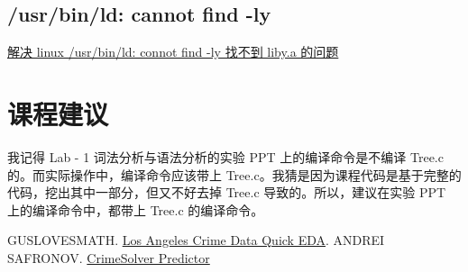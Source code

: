 \documentclass{article}
\begin{document}
\subsection{/usr/bin/ld: cannot find -ly}
\href{https://github.com/ArronVague/Compilers-Construction-Laboratory/issues/1}{解决 linux /usr/bin/ld: connot find -ly 找不到 liby.a 的问题}

\section{课程建议}
我记得 Lab - 1 词法分析与语法分析的实验 PPT 上的编译命令是不编译 Tree.c 的。而实际操作中，编译命令应该带上 Tree.c。我猜是因为课程代码是基于完整的代码，挖出其中一部分，但又不好去掉 Tree.c 导致的。所以，建议在实验 PPT 上的编译命令中，都带上 Tree.c 的编译命令。


\begin{thebibliography}{99}
     GUSLOVESMATH. \href{https://www.kaggle.com/code/guslovesmath/los-angeles-crime-data-quick-eda}{Los Angeles Crime Data Quick EDA}.
     ANDREI SAFRONOV. \href{https://www.kaggle.com/code/safronov00/crimesolver-predictor#2.-Clean-Data}{CrimeSolver Predictor}
\end{thebibliography}
\end{document}
